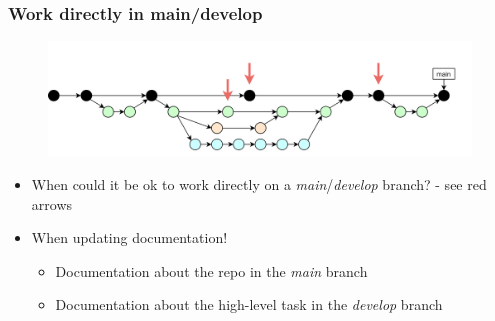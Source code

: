 \documentclass[aspectratio=169]{beamer} %
\begin{document}
\begin{frame}
	\frametitle{Work directly in main/develop}

	\vspace{-.5cm}
	\begin{minipage}[t][5cm][t]{\textwidth}
		\begin{figure}
			\centering
			\includegraphics[width=\textwidth]{./img/dime-gitflow-network-workdirectly.png}
		\end{figure}
	\end{minipage}

	\vspace{-.5cm}
	\begin{minipage}[t][5cm][t]{\textwidth}
		\begin{itemize}
			\setlength\itemsep{.5em}
			\item <1->When could it be ok to work
			directly on a \textit{main}/\textit{develop} branch?
			- see red arrows
			\item <2->When updating documentation!
			\begin{itemize}
				\setlength\itemsep{.5em}
				\item <2->Documentation about the repo
				in the \textit{main} branch
				\item <2->Documentation about the high-level task
				in the \textit{develop} branch
			\end{itemize}
		\end{itemize}
	\end{minipage}
\end{frame}
\end{document}

